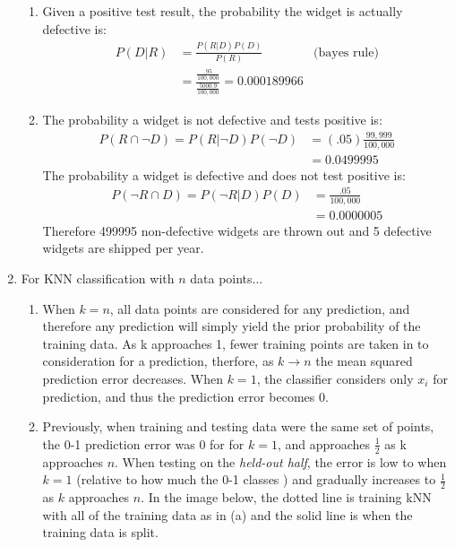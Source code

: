 \documentclass{report}
\begin{document}
\begin{enumerate}
	     
	    \begin{enumerate}[label=(\alph*)]
		\item Given a positive test result, the probability the widget is actually defective is:
	 	\begin{align*}
	 	 P(D \vert R)	&= \frac{P(R \vert D)P(D)}{P(R)} & \text{(bayes rule)} \\
	 	 				&= \frac{\frac{.95}{100,000}}{\frac{5000.9}{100,000}}
	 	 				 = \mathbf{0.000189966}
	    \end{align*}
		\item The probability a widget is not defective and tests positive is:
		\begin{align*}
		P(R \cap \lnot D) = P(R \vert \lnot D)P(\lnot D) 	&= (.05)\frac{99,999}{100,000} \\
															&= 0.0499995
		\end{align*}
		The probability a widget is defective and does not test positive is:
		\begin{align*}
		P(\lnot R \cap D) = P(\lnot R \vert  D)P(D) 	&= \frac{.05}{100,000} \\
														&= 0.0000005
		\end{align*}
		Therefore 499995 non-defective widgets are thrown out and 5 defective widgets are shipped per year.
		\end{enumerate}
		\item For KNN classification with $n$ data points...
		\begin{enumerate}
			\item When $k = n$, all data points are considered for any prediction, and therefore any prediction will simply yield the prior probability of the training data. As k approaches 1, fewer training points are taken in to consideration for a prediction, therfore, as $k \rightarrow n$ the mean squared prediction error decreases. When $k = 1$, the classifier considers only $x_i$ for prediction, and thus the prediction error becomes 0.
			\item Previously, when training and testing data were the same set of points, the 0-1 prediction error was 0 for for $k=1$, and approaches $\frac{1}{2}$ as k approaches $n$. When testing on the \textit{held-out half}, the error is low to when $k=1$ (relative to how much the 0-1 classes ) and gradually increases to $\frac{1}{2}$ as $k$ approaches $n$. In the image below, the dotted line is training kNN with all of the training data as in (a) and the solid line is when the training data is split.
			\begin{center}

\end{center}
\end{enumerate}
\end{enumerate}
\end{document}
